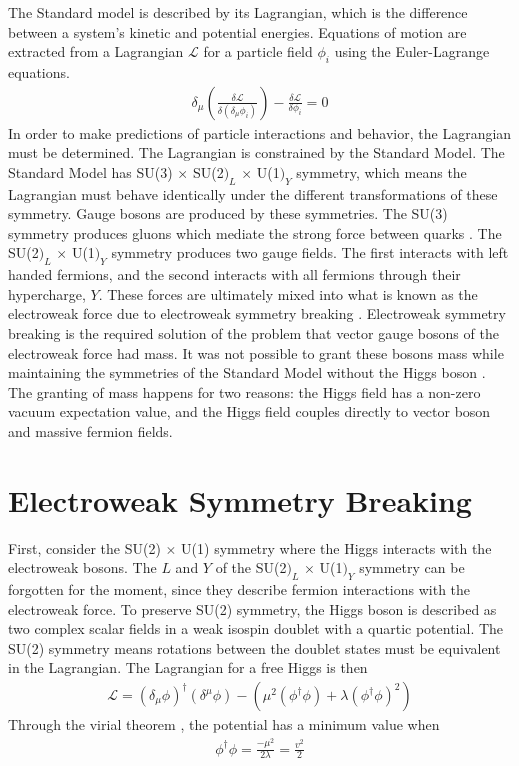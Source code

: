 The Standard model is described by its Lagrangian,
which is the difference between a system's kinetic and potential energies.
Equations of motion are extracted from a Lagrangian $\mathcal{L}$
for a particle field $\phi_i$ using the Euler-Lagrange equations.
%
\begin{gather}
  \delta_\mu\left(\frac{\delta \mathcal{L}}{\delta(\delta_\mu \phi_i)}\right) -
  \frac{\delta \mathcal{L}}{\delta \phi_i} = 0
\end{gather}
%
In order to make predictions of particle interactions and behavior, the Lagrangian must be determined.
The Lagrangian is constrained by the Standard Model.
The Standard Model has SU(3) $\times$ SU(2$)_L$ $\times$ U(1$)_Y$ symmetry,
which means the Lagrangian must behave identically under the different transformations of these symmetry.
Gauge bosons are produced by these symmetries.
The SU(3) symmetry produces gluons which mediate the strong force between quarks \cite{PhysRevLett.30.1343}.
The SU(2$)_L$ $\times$ U(1$)_Y$ symmetry produces two gauge fields.
The first interacts with left handed fermions,
and the second interacts with all fermions through their hypercharge, $Y$.
These forces are ultimately mixed into what is known as the electroweak force
due to electroweak symmetry breaking \cite{PhysRevLett.19.1264}.
Electroweak symmetry breaking is the required solution of the problem that
vector gauge bosons of the electroweak force had mass.
It was not possible to grant these bosons mass while maintaining the symmetries of the Standard Model
without the Higgs boson \cite{PhysRevLett.13.321, PhysRevLett.13.508, PhysRevLett.13.585}.
The granting of mass happens for two reasons:
the Higgs field has a non-zero vacuum expectation value,
and the Higgs field couples directly to vector boson and massive fermion fields.

\section{Electroweak Symmetry Breaking}

First, consider the SU(2) $\times$ U(1) symmetry where the Higgs interacts with the electroweak bosons.
The $L$ and $Y$ of the SU(2$)_L$ $\times$ U(1$)_Y$ symmetry can be forgotten for the moment,
since they describe fermion interactions with the electroweak force.
To preserve SU(2) symmetry, the Higgs boson is described as two complex scalar fields in
a weak isospin doublet with a quartic potential.
The SU(2) symmetry means rotations between the doublet states must be equivalent in the Lagrangian.
The Lagrangian for a free Higgs is then
\begin{gather}
  \mathcal{L} = (\delta_\mu \phi)^\dagger (\delta^\mu \phi) - (\mu^2(\phi^\dagger\phi) + \lambda(\phi^\dagger\phi)^2) \label{eq:free}
\end{gather}
Through the virial theorem \cite{1930ZPhy...63..855F}, the potential has a minimum value when
\begin{gather}
  \phi^\dagger\phi = \frac{-\mu^2}{2\lambda} = \frac{v^2}{2} \label{eq:vacuum}
\end{gather}

